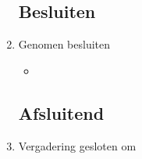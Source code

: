 \documentclass{article}
\begin{document}
\begin{enumerate}
	\subsection*{Besluiten}
	\item Genomen besluiten
	\begin{itemize}
		\item
	\end{itemize}

	\noindent 
	\subsection*{Afsluitend}
	\item Vergadering gesloten om %

\end{enumerate}
\end{document}

